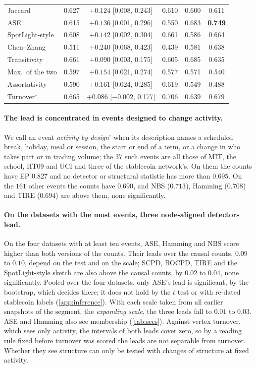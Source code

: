 \documentclass[11pt]{article}
\let\dsmidrule\midrule
\renewcommand{\midrule}{\arrayrulecolor{dsrule}\dsmidrule\arrayrulecolor{dsnavy}}
\theoremstyle{dsplain}
\theoremstyle{definition}
\begin{document}
\begin{table}[t]
\begin{tabular}{lccccc}
    Jaccard & 0.627 & $+0.124$ [0.008, 0.243] & 0.610 & 0.600 & 0.611 \\
    ASE & 0.615 & $+0.136$ [0.001, 0.296] & 0.550 & 0.683 & \textbf{0.749} \\
    SpotLight-style & 0.608 & $+0.142$ [0.002, 0.304] & 0.661 & 0.586 & 0.664 \\
    Chen--Zhang & 0.511 & $+0.240$ [0.068, 0.423] & 0.439 & 0.581 & 0.638 \\
    \midrule
    Transitivity & 0.661 & $+0.090$ [0.003, 0.175] & 0.605 & 0.685 & 0.635 \\
    Max.\ of the two & 0.597 & $+0.154$ [0.021, 0.274] & 0.577 & 0.571 & 0.540 \\
    Assortativity & 0.590 & $+0.161$ [0.024, 0.285] & 0.619 & 0.549 & 0.488 \\
    \midrule
    Turnover$^\circ$ & 0.665 & $+0.086$ [$-0.002$, 0.177] & 0.706 & 0.639 & 0.679 \\
    \bottomrule
  \end{tabular}
\end{table}

\paragraph{The lead is concentrated in events designed to change activity.} We call an event \emph{activity by
design}$^\circ$ when its description names a scheduled break, holiday, meal or session, the start or end of
a term, or a change in who takes part or in trading volume; the $37$ such events are all those of MIT, the
school, HT09 and UCI and three of the stablecoin network's. On them the counts have EP $0.827$ and no
detector or structural statistic has more than $0.695$. On the $161$ other events the counts have $0.690$, and
NBS ($0.713$), Hamming ($0.708$) and TIRE ($0.694$) are above them, none significantly.

\paragraph{On the datasets with the most events, three node-aligned detectors lead.} On the four datasets
with at least ten events, ASE, Hamming and NBS score higher than both versions of the counts. Their leads
over the causal counts, $0.09$ to $0.10$, depend on the test and on the scale; SCPD, BOCPD, TIRE and the SpotLight-style sketch are also above the causal counts, by $0.02$ to $0.04$, none significantly. Pooled over the four
datasets, only ASE's lead is significant, by the bootstrap, which decides there; it does not hold by the $t$
test or with re-dated stablecoin labels (\cref{app:inference}). With each scale taken from all earlier
snapshots of the segment, the \emph{expanding scale}, the three leads fall to $0.01$ to $0.03$. ASE and Hamming
also see membership (\cref{tab:sees}). Against vertex turnover, which sees only activity, the intervals of
both leads cover zero, so by a reading rule fixed before turnover was scored the leads are not separable
from turnover. Whether they see
structure can only be tested with changes of structure at fixed activity.
\end{document}
